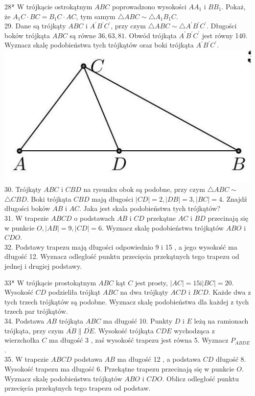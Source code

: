 \documentclass[10pt]{article}
\begin{document}
28* W trójkącie ostrokątnym \(A B C\) poprowadzono wysokości \(A A_{1}\) i \(B B_{1}\). Pokaż, że \(A_{1} C \cdot B C=B_{1} C \cdot A C\), tym samym \(\triangle A B C \sim \triangle A_{1} B_{1} C\).\\
29. Dane są trójkąty \(A B C\) i \(A^{\prime} B^{\prime} C^{\prime}\), przy czym \(\triangle A B C \sim \triangle A^{\prime} B^{\prime} C^{\prime}\). Długości boków trójkąta \(A B C\) są równe \(36,63,81\). Obwód trójkąta \(A^{\prime} B^{\prime} C^{\prime}\) jest równy 140. Wyznacz skalę podobieństwa tych trójkątów oraz boki trójkąta \(A^{\prime} B^{\prime} C^{\prime}\).\\
\includegraphics[max width=\textwidth, center]{2024_11_21_e9b4faa005d5be2cc318g-027}\\
30. Trójkąty \(A B C\) i \(C B D\) na rysunku obok są podobne, przy czym \(\triangle A B C \sim\) \(\triangle C B D\). Boki trójkąta \(C B D\) mają długości \(|C D|=2,|D B|=3,|B C|=4\). Znajdź długości boków \(A B\) i \(A C\). Jaka jest skala podobieństwa tych trójkątów?\\
31. W trapezie \(A B C D\) o podstawach \(A B\) i \(C D\) przekątne \(A C\) i \(B D\) przecinają się w punkcie \(O,|A B|=9,|C D|=6\). Wyznacz skalę podobieństwa trójkątów \(A B O\) i \(C D O\).\\
32. Podstawy trapezu mają długości odpowiednio 9 i 15 , a jego wysokość ma długość 12. Wyznacz odległość punktu przecięcia przekątnych tego trapezu od jednej i drugiej podstawy.

33* W trójkącie prostokątnym \(A B C\) kąt \(C\) jest prosty, \(|A C|=15 \mathrm{i}|B C|=20\). Wysokość \(C D\) podzieliła trójkąt \(A B C\) na dwa trójkąty \(A C D\) i \(B C D\). Każde dwa z tych trzech trójkątów są podobne. Wyznacz skalę podobieństwa dla każdej z tych trzech par trójkątów.\\
34. Podstawa \(A B\) trójkąta \(A B C\) ma długość 10. Punkty \(D\) i \(E\) leżą na ramionach trójkąta, przy czym \(\overline{A B} \| \overline{D E}\). Wysokość trójkąta \(C D E\) wychodząca z wierzchołka \(C\) ma długość 3 , zaś wysokość trapezu jest równa 5. Wyznacz \(P_{A B D E}\).\\
35. W trapezie \(A B C D\) podstawa \(A B\) ma długość 12 , a podstawa \(C D\) długość 8. Wysokość trapezu ma długość 6. Przekątne trapezu przecinają się w punkcie \(O\). Wyznacz skalę podobieństwa trójkątów \(A B O\) i \(C D O\). Oblicz odległość punktu przecięcia przekątnych tego trapezu od podstaw.
\end{document}
